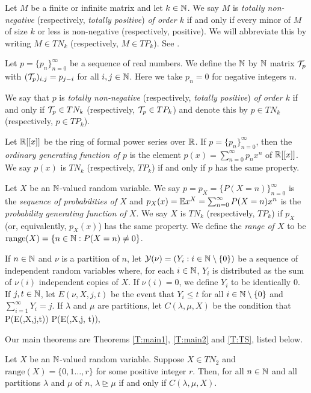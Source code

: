 \documentclass[12pt]{article}
\newcommand{\range}{\text{range}}
\begin{document}
Let $M$ be a finite or infinite matrix and let $k \in \mathbb{N}$.  We say $M$ is \emph{totally non-negative} (respectively, \emph{totally positive}) \emph{of order $k$} if and only if every minor of $M$ of size $k$ or less is non-negative (respectively, positive).  We will abbreviate this by writing $M \in TN_k$ (respectively, $M \in TP_k$). See \cite{Fallat:2011aa, Pinkus:2010aa}.

Let $p = \{p_n\}_{n=0}^\infty$ be a sequence of real numbers. We define the $\mathbb{N}$ by $\mathbb{N}$ matrix ${\cal T}_p$ with $({\cal T}_p)_{i,j} = p_{j-i}$ for all $i,j \in \mathbb{N}$.  Here we take $p_n = 0$ for negative integers $n$. 

We say that $p$ is \emph{totally non-negative} (respectively, \emph{totally positive}) \emph{of order $k$} if and only if ${\cal T}_p \in TN_k$ (respectively, ${\cal T}_p \in TP_k$) and denote this by $p \in TN_k$ (respectively, $p \in TP_k$).

Let $\mathbb{R}[[x]]$ be the ring of formal power series over $\mathbb{R}$.  If $p = \{p_n\}_{n=0}^\infty$, then the \emph{ordinary generating function of $p$} is the element $p(x)  = \sum_{n=0}^\infty p_n x^n$ of $\mathbb{R}[[x]]$. We say $p(x)$ is  $TN_k$ (respectively, $TP_k$) if and only if $p$ has the same property.

Let $X$ be an $\mathbb{N}$-valued random variable. We say $p = p_X = \{P(X=n)\}_{n=0}^\infty$ is the \emph{sequence of probabilities of $X$} and $p_X(x) = \mathbb{E} x^X = \sum_{n=0}^\infty P(X=n) x^n$ is the \emph{probability generating function of $X$}.  We say $X$ is $TN_k$ (respectively, $TP_k$) if $p_X$ (or, equivalently, $p_X(x)$) has the same property.  We define the \emph{range of $X$} to be $\text{range}(X) = \{n \in \mathbb{N}: P(X=n) \neq 0\}$.

If $n \in \mathbb{N}$ and $\nu$ is a partition of $n$, let ${\cal Y}(\nu) = (Y_i : i \in \mathbb{N} \setminus \{0\})$ be a sequence of independent random variables where, for each $i \in \mathbb{N}$, $Y_i$ is distributed as the sum of $\nu(i)$ independent copies of $X$.  If $\nu(i) = 0$, we define $Y_i$ to be identically $0$.  If $j, t \in \mathbb{N}$, let $E(\nu, X, j,t)$ be the event that $Y_i \leq t$ for all $i \in \mathbb{N} \setminus \{0\}$ and $\sum_{i=1}^\infty Y_i = j$.  If $\lambda$ and $\mu$ are partitions, let $C(\lambda,\mu,X)$ be the condition that  P(E(\lambda,X,j,t)) \leq P(E(\mu,X,j, t)),  \enq

Our main theorems are Theorems \ref{T:main1}, \ref{T:main2} and \ref{T:TS}, listed below.

\begin{theorem} \label{T:main1}
Let $X$ be an $\mathbb{N}$-valued random variable.  Suppose $X \in TN_2$ and $\range(X) = \{0,1\ldots,r\}$ for some positive integer $r$. Then, for all $n \in \mathbb{N}$ and all partitions $\lambda$ and $\mu$ of $n$, $\lambda \trianglerighteq \mu$ if and only if $C(\lambda,\mu,X)$.
\end{theorem}
\end{document}

